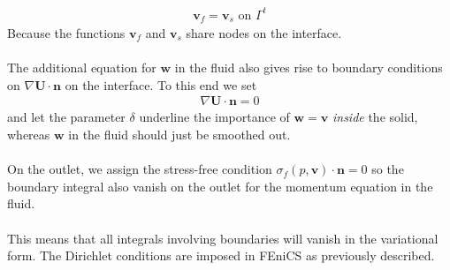 \begin{align}
\mathbf{v}_f = \mathbf{v}_s \text{ on } \Gamma^t
\end{align}
Because the functions $\mathbf{v}_f$ and $\mathbf{v}_s$ share nodes on the interface.
\\
\\
The additional equation for $\mathbf{w}$ in the fluid also gives rise to boundary conditions on $\nabla \mathbf{U}\cdot\mathbf{n}$ on the interface. To this end we set 
\begin{align}
\nabla \mathbf{U} \cdot \mathbf{n} = 0
\end{align}
and let the parameter $\delta$ underline the importance of $\mathbf{w} = \mathbf{v}$ \textit{inside} the solid, whereas $\mathbf{w}$ in the fluid should just be smoothed out. \\
\\
On the outlet, we assign the stress-free condition $\sigma_f(p,\mathbf{v}) \cdot \mathbf{n} = 0$ so the boundary integral also vanish on the outlet for the momentum equation in the fluid. 
\\
\\
This means that all integrals involving boundaries will vanish in the variational form. The Dirichlet conditions are imposed in FEniCS as previously described.




